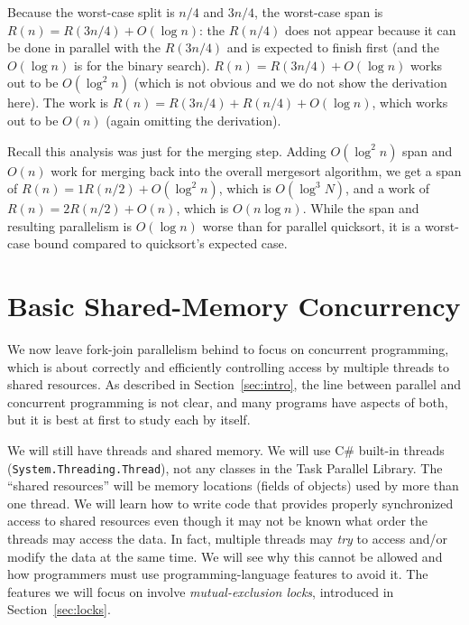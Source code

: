 \documentclass[10pt]{article}
\begin{document}
Because the worst-case split is $n/4$ and $3n/4$, the worst-case span
is $R(n)=R(3n/4)+O(\log n)$: the $R(n/4)$ does not appear because it
can be done in parallel with the $R(3n/4)$ and is expected to finish
first (and the $O(\log n)$ is for the binary search).
$R(n)=R(3n/4)+O(\log n)$ works out to be $O(\log^2 n)$ (which is not
obvious and we do not show the derivation here).  The work is
$R(n)=R(3n/4)+R(n/4) + O(\log n)$, which works out to be $O(n)$ (again
omitting the derivation).

Recall this analysis was just for the merging step.  Adding $O(\log^2
n)$ span and $O(n)$ work for merging back into the overall mergesort
algorithm, we get a span of $R(n)=1R(n/2)+O(\log^2 n)$, which is
$O(\log^3 N)$, and a work of $R(n)=2R(n/2)+O(n)$, which is $O(n\log
n)$.  While the span and resulting parallelism is $O(\log n)$ worse
than for parallel quicksort, it is a worst-case bound compared to
quicksort's expected case.

\section{Basic Shared-Memory Concurrency}
\label{sec:basic-concurrency}

We now leave fork-join parallelism behind to focus on concurrent
programming, which is about correctly and efficiently controlling
access by multiple threads to shared resources.  As described in
Section~\ref{sec:intro}, the line between parallel and concurrent
programming is not clear, and many programs have aspects of both, but
it is best at first to study each by itself.

We will still have threads and shared memory.  We will use C\#
built-in threads ({\tt System.Threading.Thread}), not any classes in the
Task Parallel Library.  The ``shared resources'' will be memory locations
(fields of objects) used by more than one thread.  We will learn how
to write code that provides properly synchronized access to shared
resources even though it may not be known what order the threads may
access the data.  In fact, multiple threads may \emph{try} to access
and/or modify the data at the same time. We will see why this cannot 
be allowed and how programmers must use programming-language features to 
avoid it. The features we will focus on involve \emph{mutual-exclusion locks},
introduced in Section~\ref{sec:locks}.
\end{document}
